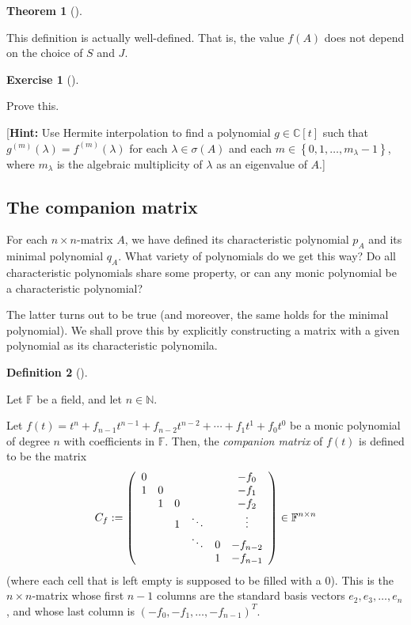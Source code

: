 \documentclass[numbers=enddot,12pt,final,onecolumn,notitlepage]{scrartcl}%
\newcounter{exer}
\numberwithin{exer}{subsection}
\theoremstyle{definition}
\newtheorem{theo}{Theorem}[subsection]
\newenvironment{theorem}[1][]
{\begin{theo}[#1]\begin{leftbar}}
{\end{leftbar}\end{theo}}
\newtheorem{defi}[theo]{Definition}
\newenvironment{definition}[1][]
{\begin{defi}[#1]\begin{leftbar}}
{\end{leftbar}\end{defi}}
\newtheorem{exmp}[exer]{Exercise}
\newenvironment{exercise}[1][]
{\begin{exmp}[#1]\begin{leftbar}}
{\end{leftbar}\end{exmp}}
\begin{document}
\begin{theorem}
This definition is actually well-defined. That is, the value $f\left(
A\right)  $ does not depend on the choice of $S$ and $J$.
\end{theorem}

\begin{exercise}
 Prove this.

[\textbf{Hint:} Use Hermite interpolation to find a polynomial $g\in
\mathbb{C}\left[  t\right]  $ such that $g^{\left(  m\right)  }\left(
\lambda\right)  =f^{\left(  m\right)  }\left(  \lambda\right)  $ for each
$\lambda\in\sigma\left(  A\right)  $ and each $m\in\left\{  0,1,\ldots
,m_{\lambda}-1\right\}  $, where $m_{\lambda}$ is the algebraic multiplicity
of $\lambda$ as an eigenvalue of $A$.]
\end{exercise}

\subsection{The companion matrix}

For each $n\times n$-matrix $A$, we have defined its characteristic polynomial
$p_{A}$ and its minimal polynomial $q_{A}$. What variety of polynomials do we
get this way? Do all characteristic polynomials share some property, or can
any monic polynomial be a characteristic polynomial?

The latter turns out to be true (and moreover, the same holds for the minimal
polynomial). We shall prove this by explicitly constructing a matrix with a
given polynomial as its characteristic polynomila.

\begin{definition}
\label{def.jnf.companion.Cf}Let $\mathbb{F}$ be a field, and let
$n\in\mathbb{N}$.

Let $f\left(  t\right)  =t^{n}+f_{n-1}t^{n-1}+f_{n-2}t^{n-2}+\cdots+f_{1}%
t^{1}+f_{0}t^{0}$ be a monic polynomial of degree $n$ with coefficients in
$\mathbb{F}$. Then, the \emph{companion matrix} of $f\left(  t\right)  $ is
defined to be the matrix%
\[
C_{f}:=\left(
\begin{array}
[c]{cccccc}%
0 &  &  &  &  & -f_{0}\\
1 & 0 &  &  &  & -f_{1}\\
& 1 & 0 &  &  & -f_{2}\\
&  & 1 & \ddots &  & \vdots\\
&  &  & \ddots & 0 & -f_{n-2}\\
&  &  &  & 1 & -f_{n-1}%
\end{array}
\right)  \in\mathbb{F}^{n\times n}%
\]
(where each cell that is left empty is supposed to be filled with a $0$). This
is the $n\times n$-matrix whose first $n-1$ columns are the standard basis
vectors $e_{2},e_{3},\ldots,e_{n}$, and whose last column is $\left(
-f_{0},-f_{1},\ldots,-f_{n-1}\right)  ^{T}$.
\end{definition}
\end{document}
